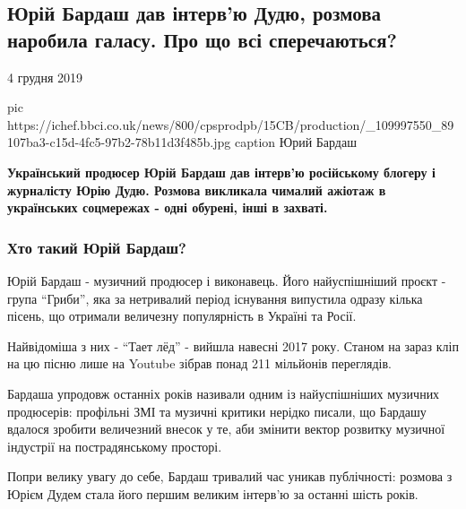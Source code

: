  
 
 
 
 

\subsection{Юрій Бардаш дав інтерв’ю Дудю, розмова наробила галасу. Про що всі сперечаються?}
\label{sec:04_12_2019.news.bbc_ua.1.bardash_dud}
4 грудня 2019

\ifcmt
pic https://ichef.bbci.co.uk/news/800/cpsprodpb/15CB/production/_109997550_89107ba3-c15d-4fc5-97b2-78b11d3f485b.jpg
caption Юрий Бардаш
\fi

\begin{leftbar}
	\bfseries Український продюсер Юрій Бардаш дав інтерв'ю російському блогеру і
журналісту Юрію Дудю. Розмова викликала чималий ажіотаж в українських
соцмережах - одні обурені, інші в захваті.
\end{leftbar}

\subsubsection{Хто такий Юрій Бардаш?}

Юрій Бардаш - музичний продюсер і виконавець. Його найуспішніший проєкт - група
\enquote{Гриби}, яка за нетривалий період існування випустила одразу кілька пісень, що
отримали величезну популярність в Україні та Росії.

Найвідоміша з них - \enquote{Тает лёд} - вийшла навесні 2017 року. Станом на зараз кліп
на цю пісню лише на Youtube зібрав понад 211 мільйонів переглядів.

Бардаша упродовж останніх років називали одним із найуспішніших музичних
продюсерів: профільні ЗМІ та музичні критики нерідко писали, що Бардашу вдалося
зробити величезний внесок у те, аби змінити вектор розвитку музичної індустрії
на пострадянському просторі.

Попри велику увагу до себе, Бардаш тривалий час уникав публічності: розмова з
Юрієм Дудем стала його першим великим інтерв'ю за останні шість років.

